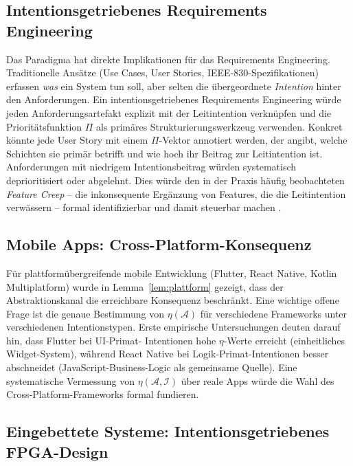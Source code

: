 ﻿\documentclass[a4paper,12pt]{article}
\theoremstyle{definition}
\begin{document}
\subsection{Intentionsgetriebenes Requirements Engineering}

Das Paradigma hat direkte Implikationen für das Requirements Engineering.
Traditionelle Ansätze (Use Cases, User Stories, IEEE-830-Spezifikationen)
erfassen \emph{was} ein System tun soll, aber selten die übergeordnete
\emph{Intention} hinter den Anforderungen. Ein intentionsgetriebenes
Requirements Engineering würde jeden Anforderungsartefakt explizit mit
der Leitintention verknüpfen und die Prioritätsfunktion $\Pi$ als
primäres Strukturierungswerkzeug verwenden. Konkret könnte jede User
Story mit einem $\Pi$-Vektor annotiert werden, der angibt, welche
Schichten sie primär betrifft und wie hoch ihr Beitrag zur Leitintention
ist. Anforderungen mit niedrigem Intentionsbeitrag würden systematisch
deprioritisiert oder abgelehnt. Dies würde den in der Praxis häufig
beobachteten \emph{Feature Creep} -- die inkonsequente Ergänzung von
Features, die die Leitintention verwässern -- formal identifizierbar
und damit steuerbar machen \cite{jacobson1992objectoriented}.

\subsection{Mobile Apps: Cross-Platform-Konsequenz}

Für plattformübergreifende mobile Entwicklung (Flutter, React Native,
Kotlin Multiplatform) wurde in Lemma~\ref{lem:plattform} gezeigt, dass
der Abstraktionskanal die erreichbare Konsequenz beschränkt. Eine
wichtige offene Frage ist die genaue Bestimmung von $\eta(\mathcal{A})$
für verschiedene Frameworks unter verschiedenen Intentionstypen. Erste
empirische Untersuchungen deuten darauf hin, dass Flutter bei UI-Primat-
Intentionen hohe $\eta$-Werte erreicht (einheitliches Widget-System),
während React Native bei Logik-Primat-Intentionen besser abschneidet
(JavaScript-Business-Logic als gemeinsame Quelle). Eine systematische
Vermessung von $\eta(\mathcal{A}, \mathcal{I})$ über reale Apps würde
die Wahl des Cross-Platform-Frameworks formal fundieren.

\subsection{Eingebettete Systeme: Intentionsgetriebenes FPGA-Design}
\end{document}
